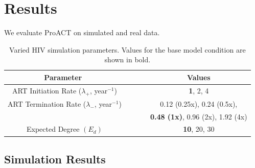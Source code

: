 \documentclass[oupdraft]{sysbio}
\begin{document}

\section{Results}
We evaluate ProACT on simulated and real data. 

\begin{table}[!t]
\begin{center}
\begin{tabular}{c c}
\toprule
\textbf{Parameter~~~~~~} & \textbf{Values}\\
\toprule
ART Initiation Rate ($\lambda_+$, year$^{-1}$)~~~~~~ & \textbf{1}, 2, 4\\
\hdashline
ART Termination Rate ($\lambda_-$, year$^{-1}$)~~~~~~ & 0.12 (0.25x), 0.24 (0.5x),\\
~~~~~~ & \textbf{0.48 (1x)}, 0.96 (2x), 1.92 (4x)\\
\hdashline
Expected Degree $\left(E_d\right)$~~~~~~ & \textbf{10}, 20, 30\\
\bottomrule
\end{tabular}
\end{center}
\caption{Varied HIV simulation parameters. Values for the base model condition are shown in bold.}
\label{tab:favites}
\end{table}

\subsection{Simulation Results}
\end{document}
